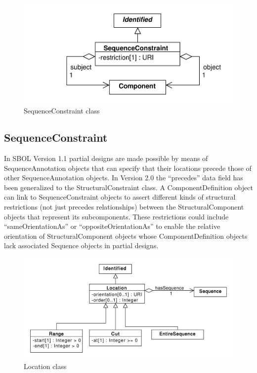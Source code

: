 \documentclass[draftspec]{sbmlpkgspec}
\begin{document}
\begin{figure}[h]
\begin{center}
\includegraphics[width=\textwidth]{uml/sequence_constraint}
\caption[]{SequenceConstraint class}
\label{uml:sequence_constraint}
\end{center}
\end{figure}

\subsection{SequenceConstraint}

In SBOL Version 1.1 partial designs are made possible by means of SequenceAnnotation objects that can specify that their locations precede those of other SequenceAnnotation objects. In Version 2.0 the “precedes” data field has been generalized to the StructuralConstraint class. A ComponentDefinition object can link to SequenceConstraint objects to assert different kinds of structural restrictions (not just precedes relationships) between the StructuralComponent objects that represent its subcomponents. These restrictions could include “sameOrientationAs” or “oppositeOrientationAs” to enable the relative orientation of StructuralComponent objects whose ComponentDefinition objects lack associated Sequence objects in partial designs.

\begin{figure}[h]
\begin{center}
\includegraphics[width=\textwidth]{uml/location}
\caption[]{Location class}
\label{uml:location}
\end{center}
\end{figure}
\end{document}
